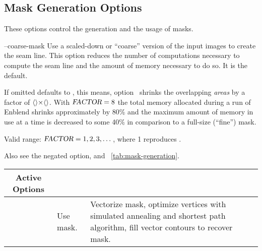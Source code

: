 

\subsection[Mask Generation Options]{\label{sec:mask-generation-options}%
  Mask Generation Options}

These options control the generation and the usage of masks.

\begin{codelist}
  \label{opt:coarse-mask}%
\item[--coarse-mask\optional{=\metavar{FACTOR}}]\itemend
  Use a scaled-down or ``coarse'' version of the input images to create the seam line.  This
  option reduces the number of computations necessary to compute the seam line and the amount of
  memory necessary to do so.  It is the default.

  If omitted  defaults to , this means,
  option~ shrinks the overlapping \emph{areas} by a factor of
  $\val{val:default-coarseness-factor}\classictimes\val{val:default-coarseness-factor}$.  With
  $\textsl{FACTOR} = 8$ the total memory allocated during a run of Enblend shrinks
  approximately by 80\% and the maximum amount of memory in use at a time is decreased to some
  40\% in comparison to a full-size (``fine'') mask.

  Valid range: $\textsl{FACTOR} = 1, 2, 3, \dots$, where 1 reproduces .

  Also see the negated option,  and
  \tableName~\ref{tab:mask-generation}.

  \begin{table}
    \begin{tabular}{lp{.3\linewidth}p{.4\linewidth}}
      \hline
      \multicolumn{1}{c|}{Active Options} &
      \multicolumn{1}{c|}{\option{--no-optimize}} &
      \multicolumn{1}{c}{\option{--optimize}} \\
      \hline\extraheadingsep
      \option{--fine-mask} & Use \acronym{NFT} mask. & Vectorize \acronym{NFT} mask, optimize
      vertices with simulated annealing and \propername{Dijkstra's} shortest path algorithm,
      fill vector contours to recover mask. \\


\end{tabular}
\end{table}
\end{codelist}
